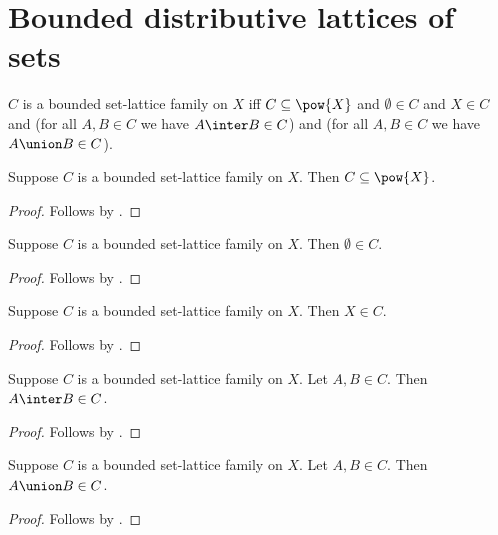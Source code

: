 \section{Bounded distributive lattices of sets}





\begin{definition}\label{bounded_set_lattice_family}
    $C$ is a bounded set-lattice family on $X$ iff
        $C\subseteq\pow{X}$ and
        $\emptyset\in C$ and
        $X\in C$ and
        (for all $A,B\in C$ we have $A\inter B\in C$) and
        (for all $A,B\in C$ we have $A\union B\in C$).
\end{definition}

\begin{proposition}\label{bounded_set_lattice_family_subsets}
    Suppose $C$ is a bounded set-lattice family on $X$.
    Then $C\subseteq\pow{X}$.
\end{proposition}
\begin{proof}
    Follows by .
\end{proof}

\begin{proposition}\label{bounded_set_lattice_family_emptyset}
    Suppose $C$ is a bounded set-lattice family on $X$.
    Then $\emptyset\in C$.
\end{proposition}
\begin{proof}
    Follows by .
\end{proof}

\begin{proposition}\label{bounded_set_lattice_family_whole}
    Suppose $C$ is a bounded set-lattice family on $X$.
    Then $X\in C$.
\end{proposition}
\begin{proof}
    Follows by .
\end{proof}

\begin{proposition}\label{bounded_set_lattice_family_inter}
    Suppose $C$ is a bounded set-lattice family on $X$.
    Let $A,B\in C$.
    Then $A\inter B\in C$.
\end{proposition}
\begin{proof}
    Follows by .
\end{proof}

\begin{proposition}\label{bounded_set_lattice_family_union}
    Suppose $C$ is a bounded set-lattice family on $X$.
    Let $A,B\in C$.
    Then $A\union B\in C$.
\end{proposition}
\begin{proof}
    Follows by .
\end{proof}

